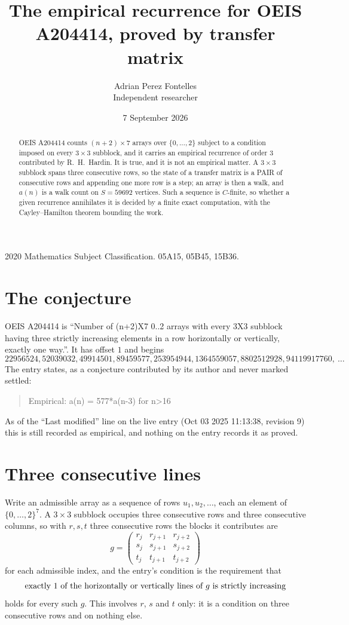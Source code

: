 \documentclass[11pt,a4paper]{article}
\title{The empirical recurrence for OEIS A204414, proved by transfer matrix}
\author{Adrian Perez Fontelles\\ \small Independent researcher}
\date{7 September 2026}
\theoremstyle{plain}
\theoremstyle{definition}
\begin{document}
\maketitle

\begin{abstract}
OEIS A204414 counts $(n+2)\times7$ arrays over $\{0,\dots,2\}$ subject to a condition imposed on
every $3\times3$ subblock, and it carries an empirical recurrence of order $3$
contributed by R.~H.~Hardin. It is true, and it is not an empirical matter. A $3\times3$
subblock spans three consecutive rows, so the state of a transfer matrix is a PAIR of
consecutive rows and appending one more row is a step; an array is then a walk, and
$a(n)$ is a walk count on $S=59692$ vertices. Such a sequence is $C$-finite, so whether a given
recurrence annihilates it is decided by a finite exact computation, with the Cayley--Hamilton
theorem bounding the work.
\end{abstract}

\noindent\small 2020 Mathematics Subject Classification. 05A15, 05B45, 15B36.\normalsize

\section{The conjecture}

OEIS A204414 is ``Number of (n+2)X7 0..2 arrays with every 3X3 subblock having three strictly increasing elements in a row horizontally or vertically, exactly one way.''. It has offset $1$ and begins
\[
22956524, 52039032, 49914501, 89459577, 253954944, 1364559057, 8802512928, 94119917760,\ \dots
\]
The entry states, as a conjecture contributed by its author and never marked settled:
\begin{quote}
Empirical: a(n) = 577*a(n-3) for n>16
\end{quote}
As of the ``Last modified'' line on the live entry (Oct 03 2025 11:13:38, revision 9) this is still
recorded as empirical, and nothing on the entry records it as proved.

\section{Three consecutive lines}

Write an admissible array as a sequence of rows $u_1,u_2,\dots$, each an element of
$\{0,\dots,2\}^{7}$. A $3\times3$ subblock occupies three consecutive rows and
three consecutive columns, so with $r,s,t$ three consecutive rows the blocks it
contributes are
\[
g=\begin{pmatrix}r_j&r_{j+1}&r_{j+2}\\ s_j&s_{j+1}&s_{j+2}\\ t_j&t_{j+1}&t_{j+2}\end{pmatrix}
\]
for each admissible index, and the entry's condition is the requirement that
\[
\text{exactly }1\text{ of the horizontally or vertically lines of }g\text{ \text{is strictly increasing}}
\]
holds for every such $g$. This involves $r$, $s$ and $t$ only: it is a condition on
three consecutive rows and on nothing else.
\end{document}

